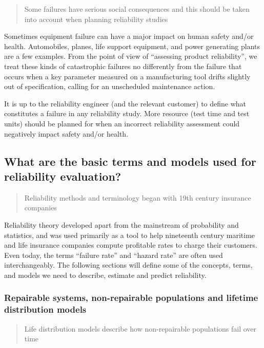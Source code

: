 \documentclass[]{book}
\theoremstyle{definition}
\theoremstyle{definition}
\theoremstyle{definition}
\theoremstyle{remark}
\begin{document}
\begin{quote}
Some failures have serious social consequences and this should be taken
into account when planning reliability studies
\end{quote}

Sometimes equipment failure can have a major impact on human safety
and/or health. Automobiles, planes, life support equipment, and power
generating plants are a few examples. From the point of view of
``assessing product reliability'', we treat these kinds of catastrophic
failures no differently from the failure that occurs when a key
parameter measured on a manufacturing tool drifts slightly out of
specification, calling for an unscheduled maintenance action.

It is up to the reliability engineer (and the relevant customer) to
define what constitutes a failure in any reliability study. More
resource (test time and test units) should be planned for when an
incorrect reliability assessment could negatively impact safety and/or
health.

\subsection{What are the basic terms and models used for reliability
evaluation?}\label{what-are-the-basic-terms-and-models-used-for-reliability-evaluation}

\begin{quote}
Reliability methods and terminology began with 19th century insurance
companies
\end{quote}

Reliability theory developed apart from the mainstream of probability
and statistics, and was used primarily as a tool to help nineteenth
century maritime and life insurance companies compute profitable rates
to charge their customers. Even today, the terms ``failure rate'' and
``hazard rate'' are often used interchangeably. The following sections
will define some of the concepts, terms, and models we need to describe,
estimate and predict reliability.

\subsubsection{Repairable systems, non-repairable populations and
lifetime distribution
models}\label{repairable-systems-non-repairable-populations-and-lifetime-distribution-models}

\begin{quote}
Life distribution models describe how non-repairable populations fail
over time
\end{quote}
\end{document}

